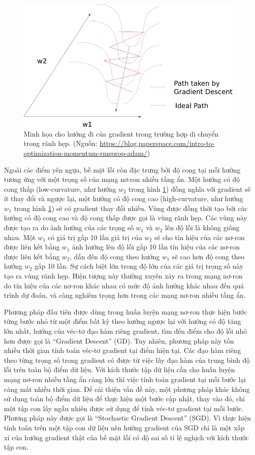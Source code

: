 \begin{figure}[htp]
	\centering
	\includegraphics[width=100 mm]{images/valley.png}
	\caption{Minh họa cho hướng đi của gradient trong trường hợp di chuyển trong rãnh hẹp. (Nguồn: \url{https://blog.paperspace.com/intro-to-optimization-momentum-rmsprop-adam/})}
	\label{fig:valley}
\end{figure}

Ngoài các điểm yên ngựa, bề mặt lỗi còn đặc trưng bởi độ cong tại mỗi hướng tương ứng với một trọng số của mạng nơ-ron nhiều tầng ẩn. Một hướng có độ cong thấp (low-curvature, như hướng $w_2$ trong hình \ref{fig:valley}) đồng nghĩa với gradient sẽ ít thay đổi và ngược lại, một hướng có độ cong cao (high-curvature, như hướng $w_1$ trong hình \ref{fig:valley}) sẽ có gradient thay đổi nhiều. Vùng được đồng thời tạo bởi các hướng có độ cong cao và độ cong thấp được gọi là vùng rãnh hẹp. Các vùng này được tạo ra do ảnh hưởng của các trọng số $w_1$ và $w_2$ lên độ lỗi là không giống nhau. Một $w_1$ có giá trị gấp 10 lần giá trị của $w_2$ sẽ cho tín hiệu của các nơ-ron được liên kết bằng $w_1$ ảnh hưởng lên độ lỗi gấp 10 lần tín hiệu của các nơ-ron được liên kết bằng $w_2$, dẫn đến độ cong theo hướng $w_1$ sẽ cao hơn độ cong theo hướng $w_2$ gấp 10 lần. Sự cách biệt lớn trong độ lớn của các giá trị trọng số này tạo ra vùng rãnh hẹp. Hiện tượng này thường xuyên xảy ra trong mạng nơ-ron do tín hiệu của các nơ-ron khác nhau có mức độ ảnh hưởng khác nhau đến quá trình dự đoán, và càng nghiêm trọng hơn trong các mạng nơ-ron nhiều tầng ẩn.

Phương pháp đầu tiên được dùng trong huấn luyện mạng nơ-ron thực hiện bước từng bước nhỏ từ một điểm bất kỳ theo hướng ngược lại với hướng có độ tăng lớn nhất, hướng của véc-tơ đạo hàm riêng gradient, tìm đến điểm cho độ lỗi nhỏ hơn được gọi là ``Gradient Descent'' (GD). Tuy nhiên, phương pháp này tốn nhiều thời gian tính toán véc-tơ gradient tại điểm hiện tại. Các đạo hàm riêng theo từng trọng số trong gradient có được từ việc lấy đạo hàm của trung bình độ lỗi trên toàn bộ điểm dữ liệu. Với kích thước tập dữ liệu cần cho huấn luyện mạng nơ-ron nhiều tầng ẩn càng lớn thì việc tính toán gradient tại mỗi bước lại càng mất nhiều thời gian. Để cải thiện vấn đề này, một phương pháp khác không sử dụng toàn bộ điểm dữ liệu để thực hiện một bước cập nhật, thay vào đó, chỉ một tập con lấy ngẫu nhiên được sử dụng để tính véc-tơ gradient tại mỗi bước. Phương pháp này được gọi là ``Stochastic Gradient Descent'' (SGD). Vì thực hiện tính toán trên một tập con dữ liệu nên hướng gradient của SGD chỉ là một xấp xỉ của hướng gradient thật của bề mặt lỗi có độ sai số tỉ lệ nghịch với kích thước tập con.

